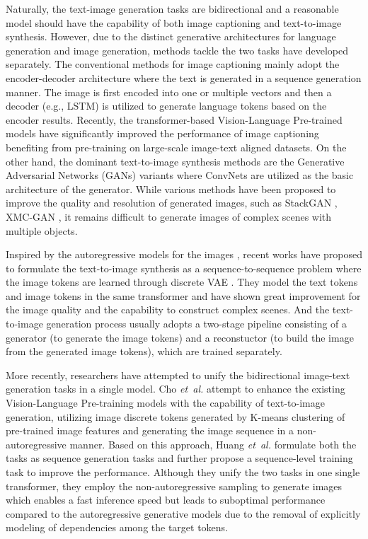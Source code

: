 \documentclass{article}
\begin{document}
Naturally, the text-image generation tasks are bidirectional and a reasonable model should have the capability of both image captioning and text-to-image synthesis. 
However, due to the distinct generative architectures for language generation and image generation, methods tackle the two tasks have developed separately. 
The conventional methods for image captioning mainly adopt 
the encoder-decoder architecture \cite{vinyals2015show} where the text is generated in a sequence generation manner. The image is first encoded into one or multiple vectors and then a decoder (e.g., LSTM) is utilized to generate language tokens based on the encoder results.  Recently, the transformer-based Vision-Language Pre-trained models \cite{zhou2020unified,li2020oscar} have significantly improved the performance of image captioning benefiting from pre-training on large-scale image-text aligned datasets.
On the other hand, the dominant text-to-image synthesis methods are the Generative Adversarial Networks (GANs) \cite{goodfellow2014generative} variants where ConvNets are utilized as the basic architecture of the generator. While various methods have been proposed to improve the quality and resolution of generated images, such as StackGAN \cite{zhang2017stackgan}, XMC-GAN \cite{zhang2021cross}, it remains difficult to generate images of complex scenes with multiple objects. 

Inspired by the autoregressive models for the images \cite{oord2016conditional,chen2020generative}, recent works \cite{ramesh2021zero,ding2021cogview} have proposed to formulate the text-to-image synthesis as a sequence-to-sequence problem where the image tokens are learned through discrete VAE \cite{oord2017neural,ramesh2021zero}. They model the text tokens and image tokens in the same transformer and have shown great improvement for the image quality and the capability to construct complex scenes. 
And the text-to-image generation process usually adopts a two-stage pipeline consisting of a generator (to generate the image tokens) and a reconstuctor (to build the image from the generated image tokens), which are trained separately. 


More recently, researchers have attempted to unify the bidirectional image-text generation tasks in a single model. Cho {\em et\ al.} \cite{cho2020x} attempt to enhance the existing Vision-Language Pre-training models with the capability of text-to-image generation, utilizing image discrete tokens generated by K-means clustering of pre-trained image features and generating the image sequence in a non-autoregressive manner. 
Based on this approach, Huang {\em et\ al.} \cite{huang2021unifying} formulate both the tasks as sequence generation tasks and further propose a sequence-level training task to improve the performance. 
Although they unify the two tasks in one single transformer, they employ the non-autoregressive sampling to generate images which enables a fast inference speed but leads to suboptimal performance compared to the autoregressive generative models due to the removal of explicitly modeling of dependencies among the target tokens. 
\end{document}
